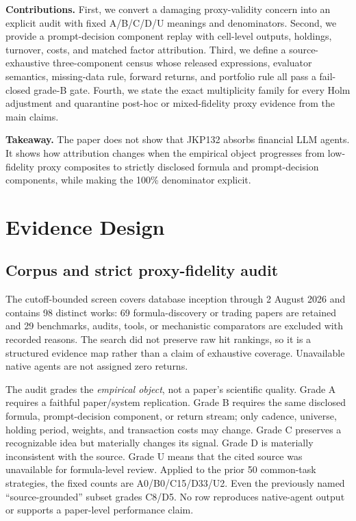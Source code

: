 \documentclass[sigconf,anonymous]{acmart}
\begin{document}
\textbf{Contributions.} First, we convert a damaging proxy-validity concern into an explicit audit with fixed A/B/C/D/U meanings and denominators. Second, we provide a prompt-decision component replay with cell-level outputs, holdings, turnover, costs, and matched factor attribution. Third, we define a source-exhaustive three-component census whose released expressions, evaluator semantics, missing-data rule, forward returns, and portfolio rule all pass a fail-closed grade-B gate. Fourth, we state the exact multiplicity family for every Holm adjustment and quarantine post-hoc or mixed-fidelity proxy evidence from the main claims.

\textbf{Takeaway.} The paper does not show that JKP132 absorbs financial LLM agents. It shows how attribution changes when the empirical object progresses from low-fidelity proxy composites to strictly disclosed formula and prompt-decision components, while making the 100\% denominator explicit.

\section{Evidence Design}

\subsection{Corpus and strict proxy-fidelity audit}

The cutoff-bounded screen covers database inception through 2 August 2026 and contains 98 distinct works: 69 formula-discovery or trading papers are retained and 29 benchmarks, audits, tools, or mechanistic comparators are excluded with recorded reasons. The search did not preserve raw hit rankings, so it is a structured evidence map rather than a claim of exhaustive coverage. Unavailable native agents are not assigned zero returns.

The audit grades the \emph{empirical object}, not a paper's scientific quality. Grade A requires a faithful paper/system replication. Grade B requires the same disclosed formula, prompt-decision component, or return stream; only cadence, universe, holding period, weights, and transaction costs may change. Grade C preserves a recognizable idea but materially changes its signal. Grade D is materially inconsistent with the source. Grade U means that the cited source was unavailable for formula-level review. Applied to the prior 50 common-task strategies, the fixed counts are A0/B0/C15/D33/U2. Even the previously named ``source-grounded'' subset grades C8/D5. No row reproduces native-agent output or supports a paper-level performance claim.
\end{document}
